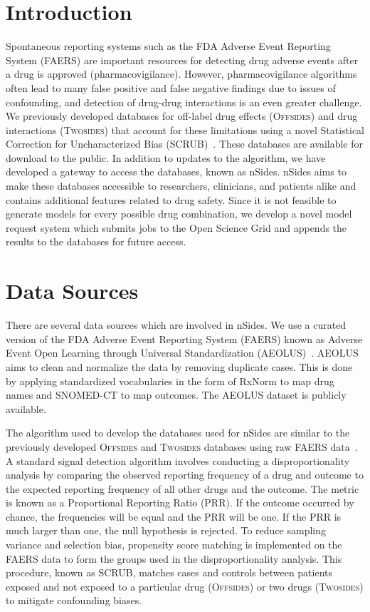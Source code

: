 \documentclass{ws-procs11x85}
\begin{document}
\bodymatter

\section{Introduction}

Spontaneous reporting systems such as the FDA Adverse Event Reporting
System (FAERS) are important resources for detecting drug adverse
events after a drug is approved (pharmacovigilance). However,
pharmacovigilance algorithms often lead to many false positive and
false negative findings due to issues of confounding, and detection of
drug-drug interactions is an even greater challenge.  We previously
developed databases for off-label drug effects (O\textsc{ffsides}) and
drug interactions (T\textsc{wosides}) that account for these
limitations using a novel Statistical Correction for Uncharacterized
Bias (SCRUB)~\cite{Tatonetti2012}.  These databases are available for
download to the public.  In addition to updates to the algorithm, we
have developed a gateway to access the databases, known as nSides.
nSides aims to make these databases accessible to researchers,
clinicians, and patients alike and contains additional features
related to drug safety.  Since it is not feasible to generate models
for every possible drug combination, we develop a novel model request
system which submits jobs to the Open Science Grid and appends the
results to the databases for future access.

\section{Data Sources}

There are several data sources which are involved in nSides. We use a
curated version of the FDA Adverse Event Reporting System (FAERS)
known as Adverse Event Open Learning through Universal Standardization
(AEOLUS)~\cite{AEOLUS}.  AEOLUS aims to clean and normalize the data
by removing duplicate cases. This is done by applying standardized
vocabularies in the form of RxNorm to map drug names and SNOMED-CT to
map outcomes. The AEOLUS dataset is publicly available.

The algorithm used to develop the databases used for nSides are
similar to the previously developed O\textsc{ffsides} and
T\textsc{wosides} databases using raw FAERS data~\cite{Tatonetti2012}.
A standard signal detection algorithm involves conducting a
disproportionality analysis by comparing the observed reporting
frequency of a drug and outcome to the expected reporting frequency of
all other drugs and the outcome. The metric is known as a Proportional
Reporting Ratio (PRR). If the outcome occurred by chance, the
frequencies will be equal and the PRR will be one. If the PRR is much
larger than one, the null hypothesis is rejected. To reduce sampling
variance and selection bias, propensity score matching is implemented
on the FAERS data to form the groups used in the disproportionality
analysis. This procedure, known as SCRUB, matches cases and controls
between patients exposed and not exposed to a particular drug
(O\textsc{ffsides}) or two drugs (T\textsc{wosides}) to mitigate
confounding biases.
\end{document}
